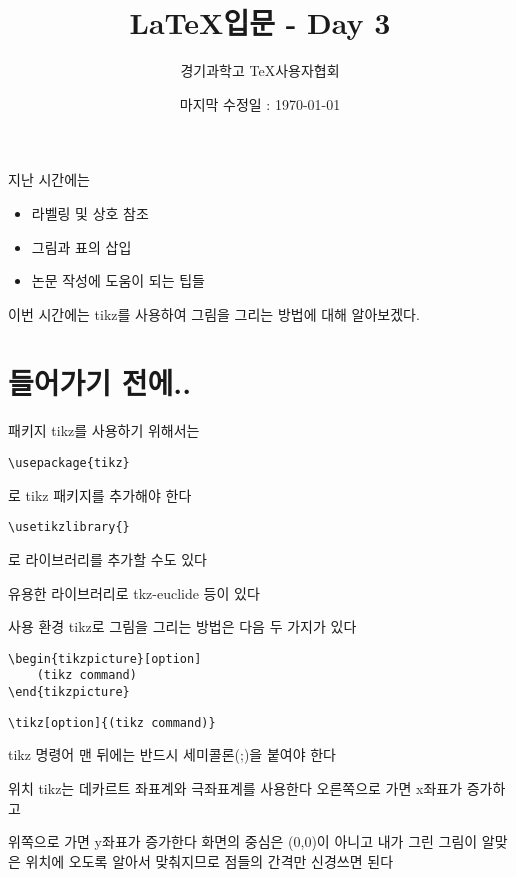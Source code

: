 \documentclass[12pt]{beamer}
\title[\LaTeX - Day 3]{\LaTeX 입문 - Day 3}
\author{경기과학고 \TeX 사용자협회}
\institute[GSHSTeXSociety]{\url{latex.gs.hs.kr}}
\date{마지막 수정일 : \today}
\begin{document}
\begin{frame}
\titlepage %
\end{frame}

\begin{frame}{지난 시간에는}
	\begin{itemize}
		\item 라벨링 및 상호 참조
		\item 그림과 표의 삽입
		\item 논문 작성에 도움이 되는 팁들
	\end{itemize}
	\vfill
	이번 시간에는 tikz를 사용하여 그림을 그리는 방법에 대해 알아보겠다.
\end{frame}

\section{들어가기 전에..}
\begin{frame}[fragile]{패키지}
	tikz를 사용하기 위해서는
	\begin{lstlisting}
\usepackage{tikz}
	\end{lstlisting}
	로 tikz 패키지를 추가해야 한다
	\vfill
	\begin{lstlisting}
\usetikzlibrary{}
	\end{lstlisting}
	로 라이브러리를 추가할 수도 있다
	
	유용한 라이브러리로 tkz-euclide 등이 있다
\end{frame}

\begin{frame}[fragile]{사용 환경}
	tikz로 그림을 그리는 방법은 다음 두 가지가 있다
	\vfill
	\begin{lstlisting}
\begin{tikzpicture}[option]
	(tikz command)
\end{tikzpicture}
	\end{lstlisting}
	\vfill
	\begin{lstlisting}
\tikz[option]{(tikz command)}
	\end{lstlisting}
	\vfill
	tikz 명령어 맨 뒤에는 반드시 세미콜론(;)을 붙여야 한다
\end{frame}

\begin{frame}{위치}
	tikz는 데카르트 좌표계와 극좌표계를 사용한다
	\vfill
	오른쪽으로 가면 x좌표가 증가하고

	위쪽으로 가면 y좌표가 증가한다
	\vfill
	화면의 중심은 (0,0)이 아니고 내가 그린 그림이 알맞은 위치에 오도록 알아서 맞춰지므로 점들의 간격만 신경쓰면 된다
\end{frame}
\end{document}
